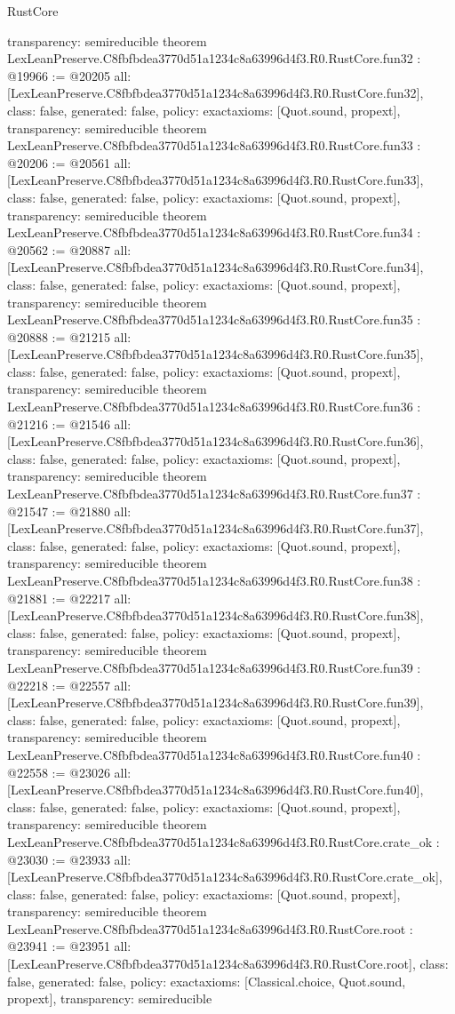 \begin{lexlean}{RustCore}
\begin{coremodule}
{  transparency: semireducible
}
theorem LexLeanPreserve.C8fbfbdea3770d51a1234c8a63996d4f3.R0.RustCore.fun32 : @19966 := @20205 {
  all: [LexLeanPreserve.C8fbfbdea3770d51a1234c8a63996d4f3.R0.RustCore.fun32],
  class: false,
  generated: false,
  policy: exact{axioms: [Quot.sound, propext]},
  transparency: semireducible
}
theorem LexLeanPreserve.C8fbfbdea3770d51a1234c8a63996d4f3.R0.RustCore.fun33 : @20206 := @20561 {
  all: [LexLeanPreserve.C8fbfbdea3770d51a1234c8a63996d4f3.R0.RustCore.fun33],
  class: false,
  generated: false,
  policy: exact{axioms: [Quot.sound, propext]},
  transparency: semireducible
}
theorem LexLeanPreserve.C8fbfbdea3770d51a1234c8a63996d4f3.R0.RustCore.fun34 : @20562 := @20887 {
  all: [LexLeanPreserve.C8fbfbdea3770d51a1234c8a63996d4f3.R0.RustCore.fun34],
  class: false,
  generated: false,
  policy: exact{axioms: [Quot.sound, propext]},
  transparency: semireducible
}
theorem LexLeanPreserve.C8fbfbdea3770d51a1234c8a63996d4f3.R0.RustCore.fun35 : @20888 := @21215 {
  all: [LexLeanPreserve.C8fbfbdea3770d51a1234c8a63996d4f3.R0.RustCore.fun35],
  class: false,
  generated: false,
  policy: exact{axioms: [Quot.sound, propext]},
  transparency: semireducible
}
theorem LexLeanPreserve.C8fbfbdea3770d51a1234c8a63996d4f3.R0.RustCore.fun36 : @21216 := @21546 {
  all: [LexLeanPreserve.C8fbfbdea3770d51a1234c8a63996d4f3.R0.RustCore.fun36],
  class: false,
  generated: false,
  policy: exact{axioms: [Quot.sound, propext]},
  transparency: semireducible
}
theorem LexLeanPreserve.C8fbfbdea3770d51a1234c8a63996d4f3.R0.RustCore.fun37 : @21547 := @21880 {
  all: [LexLeanPreserve.C8fbfbdea3770d51a1234c8a63996d4f3.R0.RustCore.fun37],
  class: false,
  generated: false,
  policy: exact{axioms: [Quot.sound, propext]},
  transparency: semireducible
}
theorem LexLeanPreserve.C8fbfbdea3770d51a1234c8a63996d4f3.R0.RustCore.fun38 : @21881 := @22217 {
  all: [LexLeanPreserve.C8fbfbdea3770d51a1234c8a63996d4f3.R0.RustCore.fun38],
  class: false,
  generated: false,
  policy: exact{axioms: [Quot.sound, propext]},
  transparency: semireducible
}
theorem LexLeanPreserve.C8fbfbdea3770d51a1234c8a63996d4f3.R0.RustCore.fun39 : @22218 := @22557 {
  all: [LexLeanPreserve.C8fbfbdea3770d51a1234c8a63996d4f3.R0.RustCore.fun39],
  class: false,
  generated: false,
  policy: exact{axioms: [Quot.sound, propext]},
  transparency: semireducible
}
theorem LexLeanPreserve.C8fbfbdea3770d51a1234c8a63996d4f3.R0.RustCore.fun40 : @22558 := @23026 {
  all: [LexLeanPreserve.C8fbfbdea3770d51a1234c8a63996d4f3.R0.RustCore.fun40],
  class: false,
  generated: false,
  policy: exact{axioms: [Quot.sound, propext]},
  transparency: semireducible
}
theorem LexLeanPreserve.C8fbfbdea3770d51a1234c8a63996d4f3.R0.RustCore.crate_ok : @23030 := @23933 {
  all: [LexLeanPreserve.C8fbfbdea3770d51a1234c8a63996d4f3.R0.RustCore.crate_ok],
  class: false,
  generated: false,
  policy: exact{axioms: [Quot.sound, propext]},
  transparency: semireducible
}
theorem LexLeanPreserve.C8fbfbdea3770d51a1234c8a63996d4f3.R0.RustCore.root : @23941 := @23951 {
  all: [LexLeanPreserve.C8fbfbdea3770d51a1234c8a63996d4f3.R0.RustCore.root],
  class: false,
  generated: false,
  policy: exact{axioms: [Classical.choice, Quot.sound, propext]},
  transparency: semireducible
}


\end{coremodule}
\end{lexlean}
